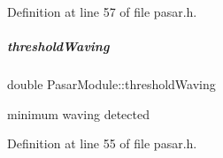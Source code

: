 Definition at line 57 of file pasar.\+h.

\mbox{\label{group__pasar_af58bfaa1d774a864584a76da4d57be4e}} 
\subparagraph{\texorpdfstring{threshold\+Waving}{thresholdWaving}}
{\footnotesize\ttfamily double Pasar\+Module\+::threshold\+Waving\hspace{0.3cm}{\ttfamily [protected]}}



minimum waving detected 



Definition at line 55 of file pasar.\+h.

